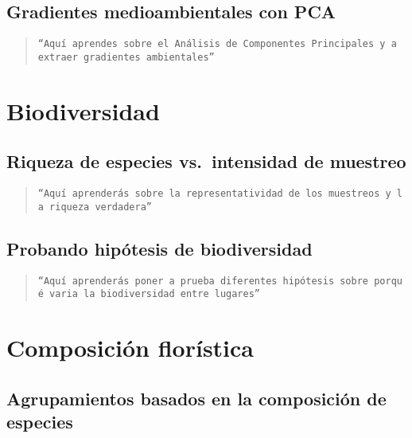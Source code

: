 \documentclass[
]{book}
\begin{document}
\hypertarget{gradientes-medioambientales-con-pca}{%
\section{Gradientes medioambientales con PCA}\label{gradientes-medioambientales-con-pca}}

\begin{quote}
\texttt{“Aquí\ aprendes\ sobre\ el\ Análisis\ de\ Componentes\ Principales\ y\ a\ extraer\ gradientes\ ambientales”}
\end{quote}

\hypertarget{biodiversidad}{%
\chapter{Biodiversidad}\label{biodiversidad}}

\hypertarget{riqueza-de-especies-vs.-intensidad-de-muestreo}{%
\section{Riqueza de especies vs.~intensidad de muestreo}\label{riqueza-de-especies-vs.-intensidad-de-muestreo}}

\begin{quote}
\texttt{“Aquí\ aprenderás\ sobre\ la\ representatividad\ de\ los\ muestreos\ y\ la\ riqueza\ verdadera”}
\end{quote}

\hypertarget{probando-hipuxf3tesis-de-biodiversidad}{%
\section{Probando hipótesis de biodiversidad}\label{probando-hipuxf3tesis-de-biodiversidad}}

\begin{quote}
\texttt{“Aquí\ aprenderás\ poner\ a\ prueba\ diferentes\ hipótesis\ sobre\ porqué\ varia\ la\ biodiversidad\ entre\ lugares”}
\end{quote}

\hypertarget{composiciuxf3n-floruxedstica}{%
\chapter{Composición florística}\label{composiciuxf3n-floruxedstica}}

\hypertarget{agrupamientos-basados-en-la-composiciuxf3n-de-especies}{%
\section{Agrupamientos basados en la composición de especies}\label{agrupamientos-basados-en-la-composiciuxf3n-de-especies}}
\end{document}
